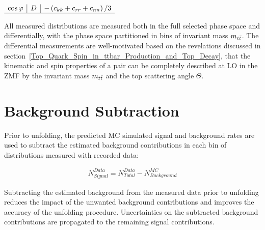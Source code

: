 \begin{refsection}
\begin{table}[htb]
\begin{center}
\begin{adjustbox}{scale=0.85,center}
\begin{math}
\begin{array}{l|l|l}
\cos \varphi & D & -\left(c_{k k}+c_{r r}+c_{n n}\right) / 3 \\
\hline 
\end{array}
\end{math}
\end{adjustbox}
\label{observables_coefficients}
\end{center}
\end{table}
All measured distributions are measured both in the full selected phase space and differentially, with the phase space partitioned in bins of \ttbar invariant mass $m_{t\bar{t}}$.
The differential measurements are well-motivated based on the revelations discussed in section~\ref{Top_Quark_Spin_in_ttbar_Production_and_Top_Decay}, that the kinematic and spin properties of a \ttbar pair can be completely described at LO in the \ttbar ZMF by the invariant mass $m_{t\bar{t}}$ and the top scattering angle $\Theta$.

\clearpage
\section{Background Subtraction}
\label{Background_Subtraction}
Prior to unfolding, the predicted MC simulated signal and background rates are used to subtract the estimated background contributions in each bin of distributions measured with recorded data:
\begin{linenomath*}
\begin{align}
N^{Data}_{Signal} = N^{Data}_{Total} - N^{MC}_{Background}
\label{Data_Background_Subtraction}
\end{align}
\end{linenomath*}
Subtracting the estimated background from the measured data prior to unfolding reduces the impact of the unwanted background contributions and improves the accuracy of the unfolding procedure.
Uncertainties on the subtracted background contributions are propagated to the remaining signal contributions.


\end{refsection}

